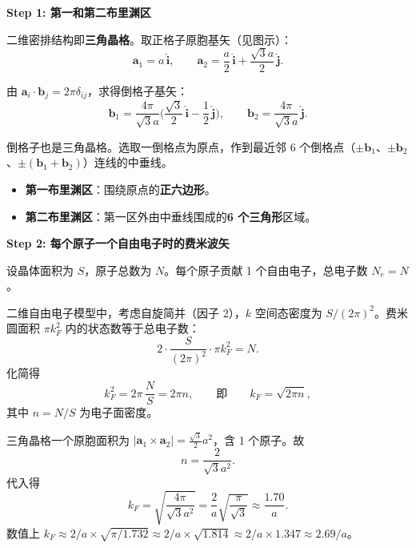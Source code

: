\begin{derivationbox}[标准解题过程]
\textbf{Step 1: 第一和第二布里渊区}

二维密排结构即\textbf{三角晶格}。取正格子原胞基矢（见图示）：
\begin{equation}
\bm{a}_1 = a\,\hat{\bm{i}},\qquad
\bm{a}_2 = \frac{a}{2}\,\hat{\bm{i}} + \frac{\sqrt{3}a}{2}\,\hat{\bm{j}}.
\end{equation}

由 $\bm{a}_i\cdot\bm{b}_j = 2\pi\delta_{ij}$，求得倒格子基矢：
\begin{equation}
\bm{b}_1 = \frac{4\pi}{\sqrt{3}a}\biggl(\frac{\sqrt{3}}{2}\,\hat{\bm{i}} - \frac{1}{2}\,\hat{\bm{j}}\biggr),\qquad
\bm{b}_2 = \frac{4\pi}{\sqrt{3}a}\,\hat{\bm{j}}.
\end{equation}

倒格子也是三角晶格。选取一倒格点为原点，作到最近邻 6 个倒格点（$\pm\bm{b}_1$、$\pm\bm{b}_2$、$\pm(\bm{b}_1+\bm{b}_2)$）连线的中垂线。

\begin{itemize}
    \item \textbf{第一布里渊区}：围绕原点的\textbf{正六边形}。
    \item \textbf{第二布里渊区}：第一区外由中垂线围成的\textbf{6 个三角形}区域。
\end{itemize}

\textbf{Step 2: 每个原子一个自由电子时的费米波矢}

设晶体面积为 $S$，原子总数为 $N$。每个原子贡献 1 个自由电子，总电子数 $N_e=N$。

二维自由电子模型中，考虑自旋简并（因子 2），$k$ 空间态密度为 $S/(2\pi)^2$。费米圆面积 $\pi k_F^2$ 内的状态数等于总电子数：
\begin{equation}
2\cdot\frac{S}{(2\pi)^2}\cdot\pi k_F^2 = N.
\end{equation}
化简得
\begin{equation}
k_F^2 = 2\pi\,\frac{N}{S} = 2\pi n,
\qquad\text{即}\qquad
k_F = \sqrt{2\pi n},
\end{equation}
其中 $n=N/S$ 为电子面密度。

三角晶格一个原胞面积为 $|\bm{a}_1\times\bm{a}_2| = \frac{\sqrt{3}}{2}a^2$，含 1 个原子。故
\begin{equation}
n = \frac{2}{\sqrt{3}a^2}.
\end{equation}
代入得
\begin{equation}
\boxed{k_F = \sqrt{\frac{4\pi}{\sqrt{3}a^2}} = \frac{2}{a}\sqrt{\frac{\pi}{\sqrt{3}}} \approx \frac{1.70}{a}.}
\end{equation}
数值上 $k_F \approx 2/a\times\sqrt{\pi/1.732} \approx 2/a\times\sqrt{1.814} \approx 2/a\times1.347 \approx 2.69/a$。


\end{derivationbox}

